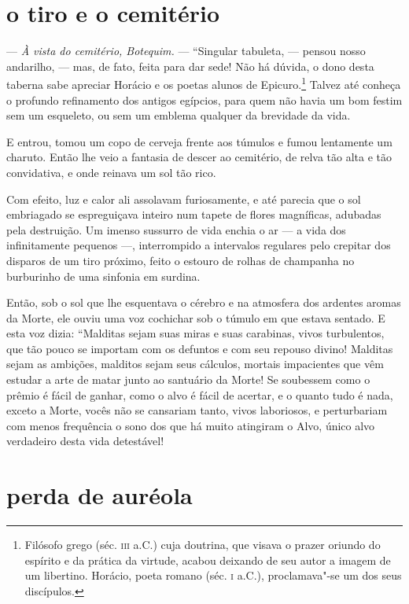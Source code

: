 \quebra\section[O tiro e o cemitério]{o tiro e o cemitério}

--- \textit{À vista do cemitério, Botequim.} --- “Singular tabuleta, ---
pensou nosso andarilho, --- mas, de fato, feita para dar sede! Não há dúvida, o dono desta taberna sabe apreciar Horácio e os poetas alunos
de Epicuro.\protect\footnote{  Filósofo grego (séc. \textsc{iii} a.C.) cuja doutrina, que
visava o prazer oriundo do espírito e da prática da virtude, acabou
deixando de seu autor a imagem de um libertino. Horácio, poeta romano
(séc. \textsc{i} a.C.), proclamava"-se um dos seus discípulos.} Talvez até conheça o
profundo refinamento dos antigos egípcios, para quem não havia um bom festim sem um
esqueleto, ou sem um emblema qualquer da brevidade da
vida.

E entrou, tomou um copo de cerveja frente aos túmulos e fumou
lentamente um charuto. Então lhe veio a fantasia de descer ao
cemitério, de relva tão alta e tão convidativa, e onde reinava um
sol tão rico.

Com efeito, luz e calor ali assolavam furiosamente, e até parecia que o sol embriagado se espreguiçava inteiro num tapete de
flores magníficas, adubadas pela destruição. Um imenso sussurro de vida
enchia o ar --- a vida dos infinitamente pequenos ---, interrompido a
intervalos regulares pelo crepitar dos disparos de um tiro próximo, 
feito o estouro de rolhas de champanha no burburinho de uma
sinfonia em surdina.

Então, sob o sol que lhe esquentava o cérebro e na atmosfera dos
ardentes aromas da Morte, ele ouviu uma voz cochichar sob o túmulo em
que estava sentado. E esta voz dizia: ``Malditas sejam
suas miras e suas carabinas, vivos turbulentos, que tão
pouco se importam com os defuntos e com seu repouso divino! Malditas sejam as
ambições, malditos sejam seus cálculos, mortais impacientes que vêm
estudar a arte de matar junto ao santuário da Morte! Se soubessem
como o prêmio é fácil de ganhar, como o alvo é fácil de acertar, e o
quanto tudo é nada, exceto a Morte, vocês não se cansariam tanto, vivos
laboriosos, e perturbariam com menos frequência o sono dos que há
muito atingiram o Alvo, único alvo verdadeiro desta vida detestável!

\quebra\section[A perda de auréola]{perda de auréola}

